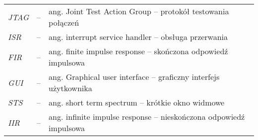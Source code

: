 \begin{tabular}{lcl}
	\textit{JTAG} & -- & ang. Joint Test Action Group -- protokół testowania połączeń \\
	\textit{ISR} & -- & ang. interrupt service handler -- obsługa przerwania \\
  \textit{FIR} & -- & ang. finite impulse response -- skończona odpowiedź impulsowa \\
	\textit{GUI} & -- & ang. Graphical user interface -- graficzny interfejs użytkownika \\
  \textit{STS} & -- & ang. short term spectrum -- krótkie okno widmowe \\
	\textit{IIR} & -- & ang. infinite impulse response -- nieskończona odpowiedź impulsowa \\
\end{tabular} 
